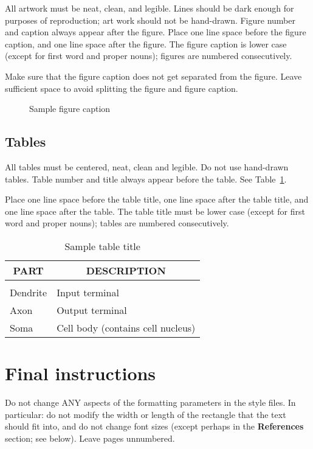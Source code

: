 All artwork must be neat, clean, and legible.  Lines
should be dark enough for purposes of reproduction; art work
should not be hand-drawn.  Figure number and caption always appear
after the figure.  Place one line space before the figure caption,
and one line space after the figure. The figure caption is lower 
case (except for first word and proper nouns); figures are 
numbered consecutively. 

Make sure that the figure caption does not get separated from the
figure. Leave sufficient space to avoid splitting the figure and 
figure caption.
\begin{figure}[h]
\vspace{1in}
\caption{Sample figure caption}
\end{figure}

\subsection{Tables}

All tables must be centered, neat, clean and legible. Do not use
hand-drawn tables. Table number and title always appear before the
table.
See Table~\ref{sample-table}.

Place one line space before the table title, one line space after the
table title, and one line space after the table. The table title
must be lower case (except for first word and proper nouns);  
tables are numbered consecutively.

\begin{table}[t]
\caption{Sample table title}
\label{sample-table}
\begin{center}
\begin{tabular}{ll}
\multicolumn{1}{c}{\bf PART}  &\multicolumn{1}{c}{\bf DESCRIPTION}
\\ \hline \\
Dendrite         &Input terminal \\
Axon             &Output terminal \\
Soma             &Cell body (contains cell nucleus) \\
\end{tabular}
\end{center}
\end{table}

\section{Final instructions}
Do not change ANY aspects of the formatting parameters in the 
style files. In particular: do not modify the width or length 
of the rectangle that the text should fit into, and do not 
change font sizes (except perhaps in the {\bf References} section; 
see below). Leave pages unnumbered. 


